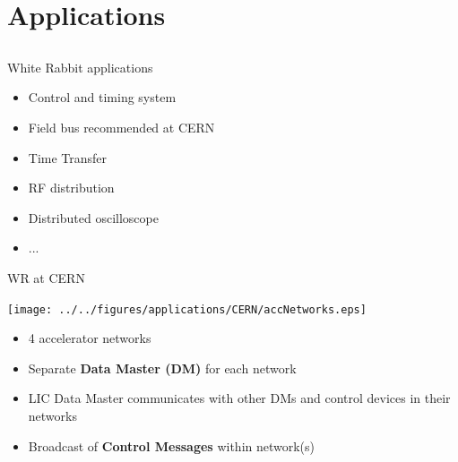 \documentclass[compress,red]{beamer}
\begin{document}
\section{Applications}
\subsection{}
\begin{frame}{White Rabbit applications}

  \begin{itemize}
    \item Control and timing system
    \item Field bus recommended at CERN
    \item Time Transfer
    \item RF distribution
    \item Distributed oscilloscope
    \item ...
  \end{itemize}

\end{frame}
\begin{frame}{WR at CERN}

      \begin{center}
      \texttt{[image: ../../figures/applications/CERN/accNetworks.eps]}
      \end{center}

  \begin{itemize}
    \item 4 accelerator networks
    \item Separate {\bf Data Master (DM)} for each network
    \item \textcolor{green!90}{LIC Data Master} communicates with other DMs and control devices in their networks
    \item Broadcast of {\bf Control Messages} within network(s)
  \end{itemize}

\end{frame}
\end{document}
